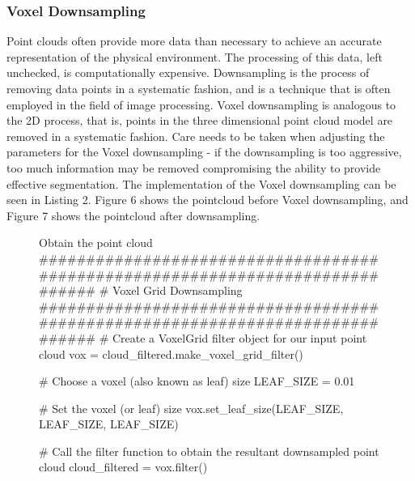 \documentclass[a4paper]{article}
\begin{document}
\newpage

\subsubsection{Voxel Downsampling}
Point clouds often provide more data than necessary to achieve an accurate representation of the physical environment. The processing of this data, left unchecked, is computationally expensive. Downsampling is the process of removing data points in a systematic fashion, and is a technique that is often employed in the field of image processing. Voxel downsampling is analogous to the 2D process, that is, points in the three dimensional point cloud model are removed in a systematic fashion. Care needs to be taken when adjusting the parameters for the Voxel downsampling - if the downsampling is too aggressive, too much information may be removed compromising the ability to provide effective segmentation. The implementation of the Voxel downsampling can be seen in Listing 2. Figure 6 shows the pointcloud before Voxel downsampling, and Figure 7 shows the pointcloud after downsampling.

\vspace{1cm}

\begin{figure}[h]\scriptsize
\begin{sexylisting}{Obtain the point cloud}
##############################################################################
    # Voxel Grid Downsampling
##############################################################################
    # Create a VoxelGrid filter object for our input point cloud
    vox = cloud_filtered.make_voxel_grid_filter()

    # Choose a voxel (also known as leaf) size
    LEAF_SIZE = 0.01

    # Set the voxel (or leaf) size
    vox.set_leaf_size(LEAF_SIZE, LEAF_SIZE, LEAF_SIZE)

    # Call the filter function to obtain the resultant downsampled point cloud
    cloud_filtered = vox.filter()
\end{sexylisting}
\end{figure}

\vspace{1cm}
\end{document}
